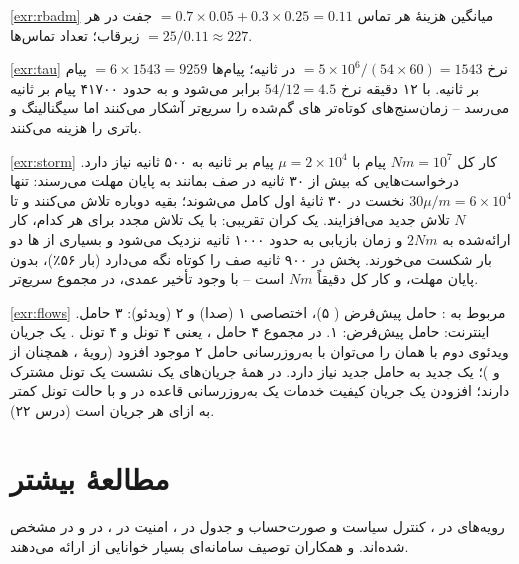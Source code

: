 \documentclass[11pt,a4paper]{article}
\begin{document}
\begin{solutionbox}{\ref{exr:rbadm}}
میانگین هزینهٔ هر تماس $= 0.7\times0.05 + 0.3\times0.25 = 0.11$ جفت  در هر زیرقاب؛ تعداد تماس‌ها
$= 25/0.11 \approx 227$.
\end{solutionbox}

\begin{solutionbox}{\ref{exr:tau}}
نرخ  $= 5\times10^6/(54\times60) = 1543$ در ثانیه؛ پیام‌ها $= 6\times1543 = 9259$ پیام بر ثانیه. با ۱۲ دقیقه نرخ
$54/12 = 4.5$ برابر می‌شود و به حدود ۴۱۷۰۰ پیام بر ثانیه می‌رسد -- زمان‌سنج‌های کوتاه‌تر های گم‌شده را سریع‌تر
آشکار می‌کنند اما سیگنالینگ و باتری  را هزینه می‌کنند.
\end{solutionbox}

\begin{solutionbox}{\ref{exr:storm}}
کار کل $Nm = 10^7$ پیام با $\mu = 2\times10^4$ پیام بر ثانیه به ۵۰۰ ثانیه نیاز دارد. درخواست‌هایی که بیش از ۳۰ ثانیه
در صف بمانند به پایان مهلت می‌رسند: تنها $30\mu/m = 6\times10^4$  نخست در ۳۰ ثانیهٔ اول کامل می‌شوند؛ بقیه دوباره
تلاش می‌کنند و تا $N$ تلاش جدید می‌افزایند. یک کران تقریبی: با یک تلاش مجدد برای هر کدام، کار ارائه‌شده به $2Nm$ و زمان
بازیابی به حدود ۱۰۰۰ ثانیه نزدیک می‌شود و بسیاری از ها دو بار شکست می‌خورند. پخش در ۹۰۰ ثانیه صف را کوتاه نگه
می‌دارد (بار ۵۶٪)، بدون پایان مهلت، و کار کل دقیقاً $Nm$ است -- با وجود تأخیر عمدی، در مجموع سریع‌تر.
\end{solutionbox}

\begin{solutionbox}{\ref{exr:flows}}
 مربوط به : حامل پیش‌فرض ( ۵)، اختصاصی  ۱ (صدا) و  ۲ (ویدئو): ۳ حامل.
 اینترنت: حامل پیش‌فرض: ۱. در مجموع ۴ حامل ، یعنی ۴ تونل  و ۴ تونل . یک جریان ویدئوی دوم
با همان  را می‌توان با به‌روزرسانی  حامل  ۲ موجود افزود (رویهٔ ، همچنان از
 و )؛ یک  جدید به حامل جدید نیاز دارد. در  همهٔ جریان‌های یک نشست
 یک تونل  مشترک دارند؛ افزودن یک جریان کیفیت خدمات یک به‌روزرسانی قاعده در  و  با
حالت تونل کمتر به ازای هر جریان است (درس ۲۲).
\end{solutionbox}

\section{مطالعهٔ بیشتر}
رویه‌های  در \cite{ts23401}، کنترل سیاست و صورت‌حساب و جدول  در \cite{ts23203}، امنیت در
\cite{ts33401}،  در \cite{ts24301} و  در \cite{ts29274} مشخص شده‌اند.  و همکاران
\cite{olsson2013epc} توصیف سامانه‌ای بسیار خوانایی از  ارائه می‌دهند.

\begin{latin}
\printbibliography[heading=subbibliography,title={References}]
\end{latin}
\end{document}
